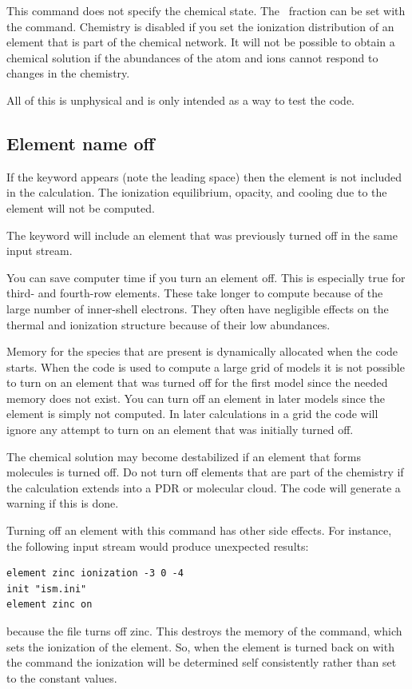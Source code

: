 This command does not specify the chemical state.
The \htwo\ fraction can
be set with the  command.
Chemistry is disabled if you set the ionization distribution of an element
that is part of the chemical network.
It will not be possible to obtain
a chemical solution if the abundances of the atom and ions cannot respond
to changes in the chemistry.

All of this is unphysical and is only intended as a way to test the code.

\subsection{Element name off}

If the keyword  appears
(note the leading space) then the element
is not included in the calculation.
The ionization equilibrium, opacity,
and cooling due to the element will not be computed.

The keyword  will include an element that was
previously turned off in the same input stream.

You can save computer time if you turn an element off.
This is especially
true for third- and fourth-row elements.
These take longer to compute
because of the large number of inner-shell electrons.
They often have
negligible effects on the thermal and ionization structure because of
their low abundances.

Memory for the species that are present is dynamically allocated when
the code starts.
When the code is used to compute a large grid of models
it is not possible to turn on an element that was turned off for the first
model since the needed memory does not exist.
You can turn off an element
in later models since the element is simply not computed.
In later
calculations in a grid the code will ignore any attempt to turn on an
element that was initially turned off.

The chemical solution may become destabilized if an element that forms
molecules is turned off.
Do not turn off elements that are part of the
chemistry if the calculation extends into a PDR or molecular cloud.
The
code will generate a warning if this is done.

Turning off an element with this command has other side effects.
For instance, the following input stream would produce unexpected results:
\begin{verbatim}
element zinc ionization -3 0 -4
init "ism.ini"
element zinc on
\end{verbatim}
because the  file turns off zinc.
This destroys the memory of the
 command,
which sets the ionization of the element.
So, when the element is turned back on with the
 command
the ionization will be determined self consistently rather than set to the
constant values.

